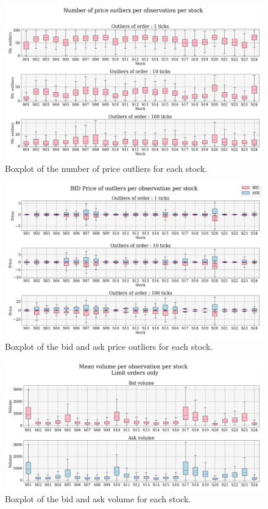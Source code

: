 \documentclass[switch, 11pt]{article}
\begin{document}
\begin{figure}[H]
    \centering
    \includegraphics[width=\columnwidth]{figures/boxplot_nb_outliers.png}
    \caption{Boxplot of the number of price outliers for each stock.}
    \label{fig:boxplot_outliers}
\end{figure}

\begin{figure}[H]
    \centering
    \includegraphics[width=\columnwidth]{figures/boxplot_price_outliers_BID_ASK.png}
    \caption{Boxplot of the bid and ask price outliers for each stock.}
    \label{fig:boxplot_price_outliers_bid_ask}
\end{figure}

\begin{figure}[H]
    \centering
    \includegraphics[width=\columnwidth]{figures/boxplot_volume_per_stock.png}
    \caption{Boxplot of the bid and ask volume for each stock.}
    \label{fig:volume}
\end{figure}
\end{document}
